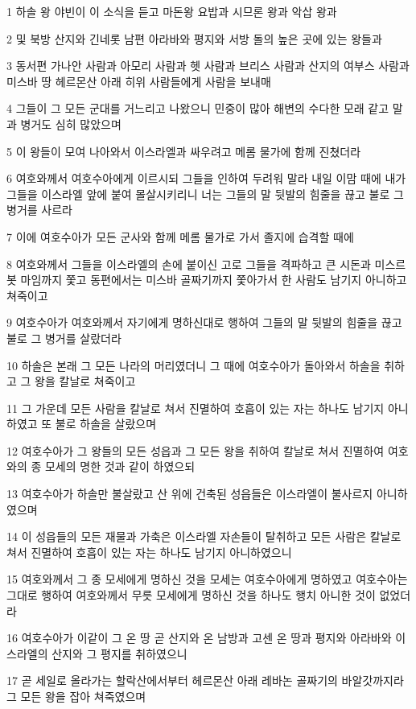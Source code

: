 \par 1 하솔 왕 야빈이 이 소식을 듣고 마돈왕 요밥과 시므론 왕과 악삽 왕과
\par 2 및 북방 산지와 긴네롯 남편 아라바와 평지와 서방 돌의 높은 곳에 있는 왕들과
\par 3 동서편 가나안 사람과 아모리 사람과 헷 사람과 브리스 사람과 산지의 여부스 사람과 미스바 땅 헤르몬산 아래 히위 사람들에게 사람을 보내매
\par 4 그들이 그 모든 군대를 거느리고 나왔으니 민중이 많아 해변의 수다한 모래 같고 말과 병거도 심히 많았으며
\par 5 이 왕들이 모여 나아와서 이스라엘과 싸우려고 메롬 물가에 함께 진쳤더라
\par 6 여호와께서 여호수아에게 이르시되 그들을 인하여 두려워 말라 내일 이맘 때에 내가 그들을 이스라엘 앞에 붙여 몰살시키리니 너는 그들의 말 뒷발의 힘줄을 끊고 불로 그 병거를 사르라
\par 7 이에 여호수아가 모든 군사와 함께 메롬 물가로 가서 졸지에 습격할 때에
\par 8 여호와께서 그들을 이스라엘의 손에 붙이신 고로 그들을 격파하고 큰 시돈과 미스르봇 마임까지 쫓고 동편에서는 미스바 골짜기까지 쫓아가서 한 사람도 남기지 아니하고 쳐죽이고
\par 9 여호수아가 여호와께서 자기에게 명하신대로 행하여 그들의 말 뒷발의 힘줄을 끊고 불로 그 병거를 살랐더라
\par 10 하솔은 본래 그 모든 나라의 머리였더니 그 때에 여호수아가 돌아와서 하솔을 취하고 그 왕을 칼날로 쳐죽이고
\par 11 그 가운데 모든 사람을 칼날로 쳐서 진멸하여 호흡이 있는 자는 하나도 남기지 아니하였고 또 불로 하솔을 살랐으며
\par 12 여호수아가 그 왕들의 모든 성읍과 그 모든 왕을 취하여 칼날로 쳐서 진멸하여 여호와의 종 모세의 명한 것과 같이 하였으되
\par 13 여호수아가 하솔만 불살랐고 산 위에 건축된 성읍들은 이스라엘이 불사르지 아니하였으며
\par 14 이 성읍들의 모든 재물과 가축은 이스라엘 자손들이 탈취하고 모든 사람은 칼날로 쳐서 진멸하여 호흡이 있는 자는 하나도 남기지 아니하였으니
\par 15 여호와께서 그 종 모세에게 명하신 것을 모세는 여호수아에게 명하였고 여호수아는 그대로 행하여 여호와께서 무릇 모세에게 명하신 것을 하나도 행치 아니한 것이 없었더라
\par 16 여호수아가 이같이 그 온 땅 곧 산지와 온 남방과 고센 온 땅과 평지와 아라바와 이스라엘의 산지와 그 평지를 취하였으니
\par 17 곧 세일로 올라가는 할락산에서부터 헤르몬산 아래 레바논 골짜기의 바알갓까지라 그 모든 왕을 잡아 쳐죽였으며
